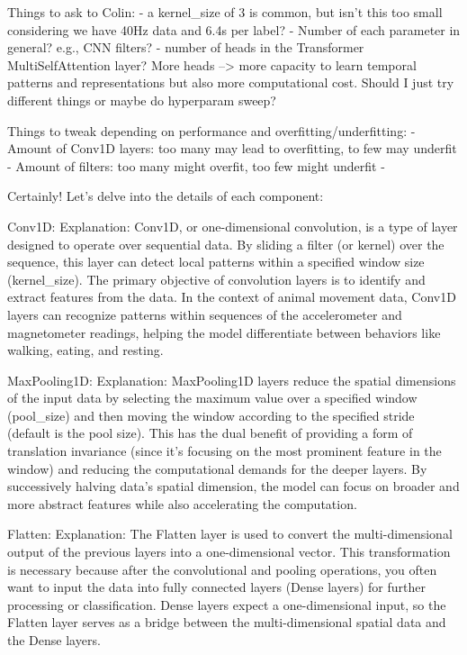Things to ask to Colin: 
- a kernel_size of 3 is common, but isn't this too small considering we have 40Hz data and 6.4s per label?
- Number of each parameter in general? e.g., CNN filters?
- number of heads in the Transformer MultiSelfAttention layer? More heads --> more capacity to learn temporal patterns and representations but also more computational cost. Should I just try different things or maybe do hyperparam sweep?

Things to tweak depending on performance and overfitting/underfitting: 
- Amount of Conv1D layers: too many may lead to overfitting, to few may underfit
- Amount of filters: too many might overfit, too few might underfit
- 



Certainly! Let's delve into the details of each component:

    Conv1D:
        Explanation: Conv1D, or one-dimensional convolution, is a type of layer designed to operate over sequential data. By sliding a filter (or kernel) over the sequence, this layer can detect local patterns within a specified window size (kernel_size). The primary objective of convolution layers is to identify and extract features from the data. In the context of animal movement data, Conv1D layers can recognize patterns within sequences of the accelerometer and magnetometer readings, helping the model differentiate between behaviors like walking, eating, and resting.

    MaxPooling1D:
        Explanation: MaxPooling1D layers reduce the spatial dimensions of the input data by selecting the maximum value over a specified window (pool_size) and then moving the window according to the specified stride (default is the pool size). This has the dual benefit of providing a form of translation invariance (since it's focusing on the most prominent feature in the window) and reducing the computational demands for the deeper layers. By successively halving data's spatial dimension, the model can focus on broader and more abstract features while also accelerating the computation.

    Flatten:
        Explanation: The Flatten layer is used to convert the multi-dimensional output of the previous layers into a one-dimensional vector. This transformation is necessary because after the convolutional and pooling operations, you often want to input the data into fully connected layers (Dense layers) for further processing or classification. Dense layers expect a one-dimensional input, so the Flatten layer serves as a bridge between the multi-dimensional spatial data and the Dense layers.

